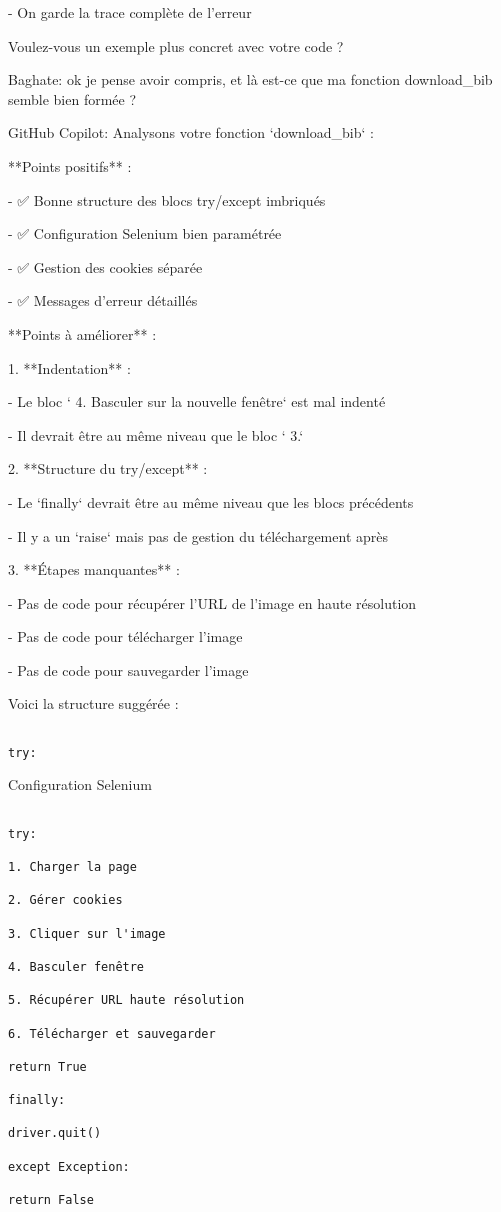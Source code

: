 - On garde la trace complète de l'erreur

Voulez-vous un exemple plus concret avec votre code ?

Baghate: ok je pense avoir compris, et là est-ce que ma fonction download\_bib semble bien formée ?

GitHub Copilot: Analysons votre fonction `download\_bib` :

**Points positifs** :

- ✅ Bonne structure des blocs try/except imbriqués

- ✅ Configuration Selenium bien paramétrée

- ✅ Gestion des cookies séparée

- ✅ Messages d'erreur détaillés

**Points à améliorer** :

1. **Indentation** :

- Le bloc `  4. Basculer sur la nouvelle fenêtre` est mal indenté

- Il devrait être au même niveau que le bloc `  3.`

2. **Structure du try/except** :

- Le `finally` devrait être au même niveau que les blocs précédents

- Il y a un `raise` mais pas de gestion du téléchargement après

3. **Étapes manquantes** :

- Pas de code pour récupérer l'URL de l'image en haute résolution

- Pas de code pour télécharger l'image

- Pas de code pour sauvegarder l'image

Voici la structure suggérée :

\begin{verbatim}

try:

\end{verbatim}

Configuration Selenium

\begin{verbatim}

try:

1. Charger la page

2. Gérer cookies

3. Cliquer sur l'image

4. Basculer fenêtre

5. Récupérer URL haute résolution

6. Télécharger et sauvegarder

return True

finally:

driver.quit()

except Exception:

return False

\end{verbatim}

